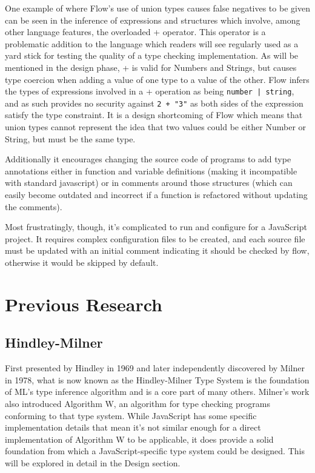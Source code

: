 \documentclass[british, twoside, openright]{bhamthesis}
\theoremstyle{definition}
\begin{document}
    One example of where Flow's use of union types causes false negatives to be given can be seen in the inference of expressions and structures which involve, among other language features, the overloaded + operator. This operator is a problematic addition to the language which readers will see regularly used as a yard stick for testing the quality of a type checking implementation. As will be mentioned in the design phase, + is valid for Numbers and Strings, but causes type coercion when adding a value of one type to a value of the other. Flow infers the types of expressions involved in a + operation as being \texttt{number | string}, and as such provides no security against \texttt{2 + "3"} as both sides of the expression satisfy the type constraint. It is a design shortcoming of Flow which means that union types cannot represent the idea that two values could be either Number or String, but must be the same type.

    Additionally it encourages changing the source code of programs to add type annotations either in function and variable definitions (making it incompatible with standard javascript) or in comments around those structures (which can easily become outdated and incorrect if a function is refactored without updating the comments).

    Most frustratingly, though, it's complicated to run and configure for a JavaScript project. It requires complex configuration files to be created, and each source file must be updated with an initial comment indicating it should be checked by flow, otherwise it would be skipped by default.

  \section{Previous Research}

    \subsection{Hindley-Milner}
      First presented by Hindley in 1969 and later independently discovered by Milner in 1978, what is now known as the Hindley-Milner Type System is the foundation of ML's type inference algorithm and is a core part of many others\autocite{Hindley1969}. Milner's work also introduced Algorithm W, an algorithm for type checking programs conforming to that type system\autocite{Milner1978}. While JavaScript has some specific implementation details that mean it's not similar enough for a direct implementation of Algorithm W to be applicable, it does provide a solid foundation from which a JavaScript-specific type system could be designed. This will be explored in detail in the Design section.
\end{document}
